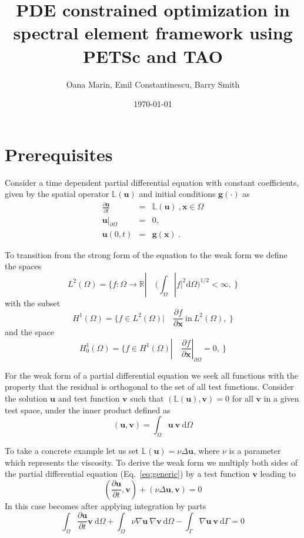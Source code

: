 \documentclass[10pt]{article}
\renewcommand{\d}{\mathrm{d}}
\newcommand{\vect}[1]{\mathbf{#1} }
\begin{document}

\title{PDE constrained optimization in spectral element framework using PETSc and TAO}
\vspace{1cm}
\author{Oana Marin, Emil Constantinescu, Barry Smith}
\date{\today}
\maketitle


\section{Prerequisites}
Consider a time dependent partial differential equation with constant coefficients, given by the spatial operator $ \mathbb L(\mathbf u)$ and initial conditions $\mathbf g(\cdot)$ as
\begin{eqnarray}
 \frac{\partial\mathbf u}{\partial t} &=&  \mathbb L(\mathbf u) \ , \mathbf x \in \Omega \\ \nonumber
  \mathbf u|_{\partial \Omega}&=&0, \\ 
  \mathbf u(0,t)&=&\mathbf g(\mathbf x) \ . \nonumber \label{eq:generic}
\end{eqnarray} 

To transition from the strong form of the equation to the weak form we define the spaces
$$
L^2(\Omega)=\lbrace f :\Omega\rightarrow \mathbb R |\quad \bigg(\int_{\Omega} |f|^2 \d \Omega \bigg)^{1/2}<\infty,\ \rbrace
$$
with the subset
$$
H^1(\Omega)=\lbrace f \in L^2(\Omega) |\quad \frac{\partial f}{\partial \vect x} \ \text{in}\  L^2(\Omega),\ \rbrace
$$
and the space
$$
H^1_0(\Omega)=\lbrace f \in H^1(\Omega) |\quad \frac{\partial f}{\partial \vect x}|_{\partial\Omega}=0 ,\ \rbrace
$$

For the weak form of a partial differential equation we seek all functions with the property that the residual is orthogonal to the set of all test functions.
Consider the solution $\mathbf u$ and test function $\mathbf v$ such that
$(\mathbb L(\vect u),\mathbf v)=0$ for all $\mathbf v$ in a given test space, under the inner product defined as
$$(\mathbf u,\mathbf v)=\int_{\Omega} \mathbf u\ \mathbf v \ \d \Omega$$

To take a concrete example let us set $\mathbb L(\mathbf u) = \nu \Delta \mathbf u$, where $\nu$ is a parameter which represents the viscosity. To derive the weak form we multiply both sides of the partial differential equation (Eq.~\ref{eq:generic}) by a test function $\mathbf v$ leading to
$$(\frac{\partial\mathbf u}{\partial t},\mathbf v) + (\nu\Delta \mathbf u, \mathbf v) =0$$
In this case  becomes after applying integration by parts
\begin{equation}
\int_{\Omega}\frac{\partial\mathbf u}{\partial t} \mathbf v \ \d \Omega + \int_{\Omega} \nu\nabla \mathbf u\ \nabla \mathbf v\ \d \Omega -
 \int_{\Gamma} \nabla \mathbf u \ \mathbf v\  \d \Gamma =0\label{eq:weakheat}
\end{equation}
\end{document}
